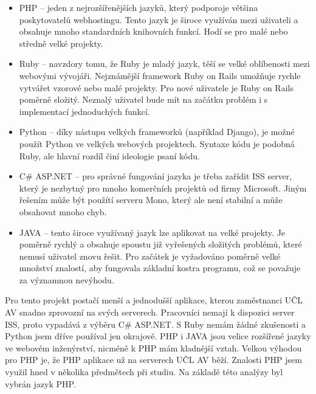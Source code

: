             \begin{itemize}
                \item PHP – jeden z nejrozšířenějších jazyků, který podporoje většina poskytovatelů webhostingu. Tento jazyk je široce využíván mezi uživateli a obsahuje mnoho standardních knihovních funkcí. Hodí se pro malé nebo středně velké projekty.
                
                \item Ruby – navzdory tomu, že Ruby je mladý jazyk, těší se velké oblíbenosti mezi webovými vývojáři. Nejznámější framework Ruby on Rails umožňuje rychle vytvářet vzorové nebo malé projekty. Pro nové uživatele je Ruby on Rails poměrně složitý. Neznalý uživatel bude mít na začátku problém i s implementací jednoduchých funkcí.
                
                \item Python – díky nástupu velkých frameworků (například Django), je možné použít Python ve velkých webových projektech. Syntaxe kódu je podobná Ruby, ale hlavní rozdíl činí ideologie psaní kódu.
                
                \item C\# ASP.NET – pro správné fungování jazyka je třeba zařídit ISS server, který je nezbytný pro mnoho komerčních projektů od firmy Microsoft. Jiným řešením může být použítí serveru Mono, který ale není stabilní a může obsahovat mnoho chyb.
                
                \item JAVA – tento široce využívaný jazyk lze aplikovat na velké projekty. Je poměrně rychlý a obsahuje spoustu již vyřešených složitých problémů, které nemusí uživatel znovu řešit. Pro začátek je vyžadováno poměrně velké množství znalostí, aby fungovala základní kostra programu, což se považuje za významnou nevýhodu.
            \end{itemize}

            Pro tento projekt postačí menší a jednodušší aplikace, kterou zaměstnanci UČL AV snadno zprovozní na svých serverech. Pracovníci nemají k dispozici server ISS, proto vypadává z výběru C\# ASP.NET. S Ruby nemám žádné zkušenosti a Python jsem dříve používal jen okrajově. PHP i JAVA jsou velice rozšířené jazyky ve webovém inženýrství, nicméně k PHP mám kladnější vztah. Velkou výhodou pro PHP je, že PHP aplikace už na serverech UČL AV běží. Znalosti PHP jsem využil hned v několika předmětech při studiu. Na základě této analýzy byl vybrán jazyk PHP.
            

